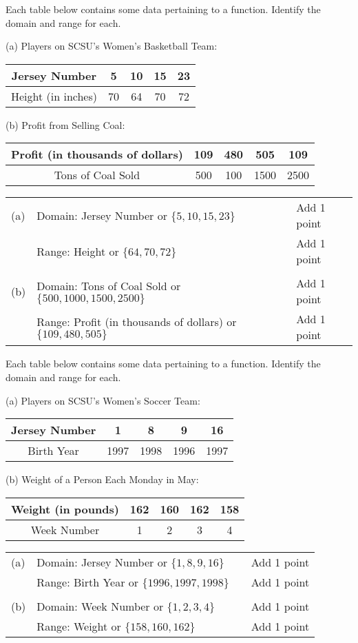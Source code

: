 {
Each table below contains some data pertaining to a function.  Identify the domain and range for each. 

\noindent (a) Players on SCSU's Women's Basketball Team:

\noindent \begin{tabular}{|c|c|c|c|c|}\hline Jersey Number& 5&10&15&23\\  \hline Height (in inches) & 70&64&70&72\\ \hline 
\end{tabular}

\bigskip\noindent (b) Profit from Selling Coal:

\noindent \begin{tabular}{|c|c|c|c|c|}\hline Profit (in thousands of dollars)& 109&480&505&109\\ \hline Tons of Coal Sold &500&100&1500&2500\\ \hline

\end{tabular}}
{\begin{tabular}{llll}
(a) &Domain: Jersey Number or $\{5,10,15,23\}$ &&Add 1 point\\
&Range: Height or $\{64,70,72\}$ &&Add 1 point\\ &&&\\
(b)&Domain: Tons of Coal Sold or $\{500,1000,1500,2500\}$ &&Add 1 point\\
&Range: Profit (in thousands of dollars)  or $\{109,480,505\}$ &&Add 1 point\\ 
\end{tabular}}



{
Each table below contains some data pertaining to a function.  Identify the domain and range for each. 

\noindent (a) Players on SCSU's Women's Soccer Team:

\noindent \begin{tabular}{|c|c|c|c|c|}\hline Jersey Number& 1&8&9&16\\  \hline Birth Year & 1997&1998&1996&1997\\ \hline 
\end{tabular}

\bigskip\noindent (b) Weight of a Person Each Monday in May:

\noindent \begin{tabular}{|c|c|c|c|c|}\hline Weight (in pounds)& 162&160&162&158\\ \hline Week Number &1&2&3&4\\ \hline

\end{tabular}}
{\begin{tabular}{llll}
(a) &Domain: Jersey Number or $\{1,8,9,16\}$ &&Add 1 point\\
&Range: Birth Year or $\{1996,1997,1998\}$ &&Add 1 point\\ &&&\\
(b)&Domain: Week Number or $\{1,2,3,4\}$ &&Add 1 point\\
&Range: Weight  or $\{158,160,162\}$ &&Add 1 point\\ 
\end{tabular}
}


